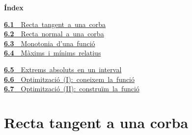 \documentclass[11pt,a4paper]{article}
\begin{document}
\begin{tcolorbox}[colback=fmsurface,colframe=fmsurface,arc=3mm,left=4mm,right=4mm,top=2mm,bottom=2mm]
\small\textbf{Índex}\par\smallskip
\begin{minipage}[t]{0.49\linewidth}\small \mbox{\hyperlink{sec1}{\textbf{\color{fmgreen}6.1}\ \ Recta tangent a una corba}}\\[3pt]
\mbox{\hyperlink{sec2}{\textbf{\color{fmgreen}6.2}\ \ Recta normal a una corba}}\\[3pt]
\mbox{\hyperlink{sec3}{\textbf{\color{fmgreen}6.3}\ \ Monotonia d'una funció}}\\[3pt]
\mbox{\hyperlink{sec4}{\textbf{\color{fmgreen}6.4}\ \ Màxims i mínims relatius}}\\[3pt]\end{minipage}\hfill\begin{minipage}[t]{0.49\linewidth}\small \mbox{\hyperlink{sec5}{\textbf{\color{fmgreen}6.5}\ \ Extrems absoluts en un interval}}\\[3pt]
\mbox{\hyperlink{sec6}{\textbf{\color{fmgreen}6.6}\ \ Optimització (I): coneixem la funció}}\\[3pt]
\mbox{\hyperlink{sec7}{\textbf{\color{fmgreen}6.7}\ \ Optimització (II): construïm la funció}}\\[3pt]\end{minipage}
\end{tcolorbox}

\section{Recta tangent a una corba}\hypertarget{sec1}{}

  
\end{document}
